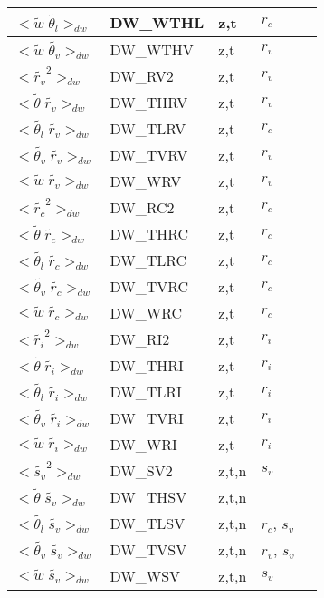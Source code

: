 \begin{center}
\begin{tabular}{||p{6cm}|>{\centering}p{2.5cm}|>{\centering}p{1.5cm}|>{\centering}p{1cm}|p{4cm }||}
\hline
$<{\tilde{w}\;\tilde{\theta_l}}>_{dw}$ & DW\_WTHL & z,t & $r_c$ & \\
\hline
$<{\tilde{w}\;\tilde{\theta_v}}>_{dw}$ & DW\_WTHV & z,t & $r_v$ & \\
\hline
$<{\tilde{r_v}}^2>_{dw}$ & DW\_RV2 & z,t & $r_v$ & \\
\hline
$<{\tilde{\theta}\;\tilde{r_v}}>_{dw}$ & DW\_THRV & z,t & $r_v$ & \\
\hline
$<{\tilde{\theta_l}\;\tilde{r_v}}>_{dw}$ & DW\_TLRV & z,t & $r_c$ & \\
\hline
$<{\tilde{\theta_v}\;\tilde{r_v}}>_{dw}$ & DW\_TVRV & z,t & $r_v$ & \\
\hline
$<{\tilde{w}\;\tilde{r_v}}>_{dw}$ & DW\_WRV & z,t & $r_v$ & \\
\hline
$<{\tilde{r_c}}^2>_{dw}$ & DW\_RC2 & z,t & $r_c$ & \\
\hline
$<{\tilde{\theta}\;\tilde{r_c}}>_{dw}$ & DW\_THRC & z,t & $r_c$ & \\
\hline
$<{\tilde{\theta_l}\;\tilde{r_c}}>_{dw}$ & DW\_TLRC & z,t & $r_c$ & \\
\hline
$<{\tilde{\theta_v}\;\tilde{r_c}}>_{dw}$ & DW\_TVRC & z,t & $r_c$ & \\
\hline
$<{\tilde{w}\;\tilde{r_c}}>_{dw}$ & DW\_WRC & z,t & $r_c$ & \\
\hline
$<{\tilde{r_i}}^2>_{dw}$ & DW\_RI2 & z,t & $r_i$ & \\
\hline
$<{\tilde{\theta}\;\tilde{r_i}}>_{dw}$ & DW\_THRI & z,t & $r_i$ & \\
\hline
$<{\tilde{\theta_l}\;\tilde{r_i}}>_{dw}$ & DW\_TLRI & z,t & $r_i$ & \\
\hline
$<{\tilde{\theta_v}\;\tilde{r_i}}>_{dw}$ & DW\_TVRI & z,t & $r_i$ & \\
\hline
$<{\tilde{w}\;\tilde{r_i}}>_{dw}$ & DW\_WRI & z,t & $r_i$ & \\
\hline
$<{\tilde{s_v}}^2>_{dw}$ & DW\_SV2 & z,t,n & $s_v$ & \\
\hline
$<{\tilde{\theta}\;\tilde{s_v}}>_{dw}$ & DW\_THSV & z,t,n & & \\
\hline
$<{\tilde{\theta_l}\;\tilde{s_v}}>_{dw}$ & DW\_TLSV & z,t,n & $r_c$, $s_v$ & \\
\hline
$<{\tilde{\theta_v}\;\tilde{s_v}}>_{dw}$& DW\_TVSV & z,t,n & $r_v$, $s_v$ & \\
\hline
$<{\tilde{w}\;\tilde{s_v}}>_{dw}$ & DW\_WSV & z,t,n & $s_v$ & \\
\hline
\hline
\end{tabular}
\end{center}
\newpage
